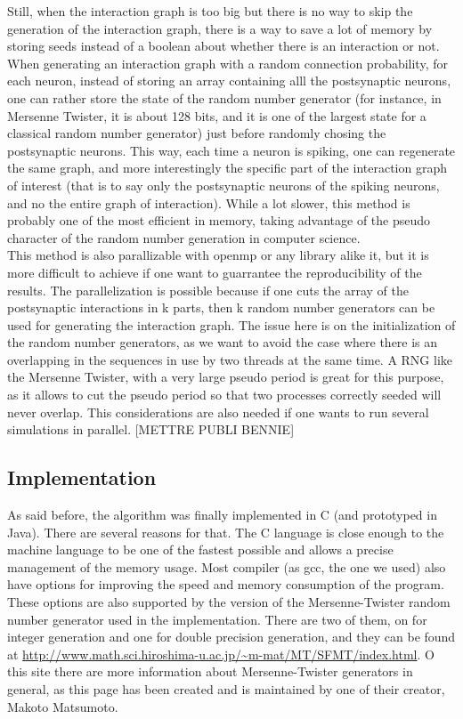 	Still, when the interaction graph is too big but there is no way to skip the generation of the interaction graph, there is a way to save a lot of memory by storing seeds instead of a boolean about whether there is an interaction or not. When generating an interaction graph with a random connection probability, for each neuron, instead of storing an array containing alll the postsynaptic neurons, one can rather store the state of the random number generator (for instance, in Mersenne Twister, it is about 128 bits, and it is one of the largest state for a classical random number generator) just before randomly chosing the postsynaptic neurons. This way, each time a neuron is spiking, one can regenerate the same graph, and more interestingly the specific part of the interaction graph of interest (that is to say only the postsynaptic neurons of the spiking neurons, and no the entire graph of interaction). While a lot slower, this method is probably one of the most efficient in memory, taking advantage of the pseudo character of the random number generation in computer science.\\

	This method is also parallizable with openmp or any library alike it, but it is more difficult to achieve if one want to guarrantee the reproducibility of the results. The parallelization is possible because if one cuts the array of the postsynaptic interactions in k parts, then k random number generators can be used for generating the interaction graph. The issue here is on the initialization of the random number generators, as we want to avoid the case where there is an overlapping in the sequences in use by two threads at the same time. A RNG like the Mersenne Twister, with a very large pseudo period is great for this purpose, as it allows to cut the pseudo period so that two processes correctly seeded will never overlap. This considerations are also needed if one wants to run several simulations in parallel. [METTRE PUBLI BENNIE]

\subsection{Implementation}
	As said before, the algorithm was finally implemented in C (and prototyped in Java). There are several reasons for that. The C language is close enough to the machine language to be one of the fastest possible and allows a precise management of the memory usage. Most compiler (as gcc, the one we used) also have options for improving the speed and memory consumption of the program. These options are also supported by the version of the Mersenne-Twister random number generator used in the implementation. There are two of them, on for integer generation and one for double precision generation, and they can be found at \url{http://www.math.sci.hiroshima-u.ac.jp/~m-mat/MT/SFMT/index.html}. O this site there are more information about Mersenne-Twister generators in general, as this page has been created and is maintained by one of their creator, Makoto Matsumoto.\\

